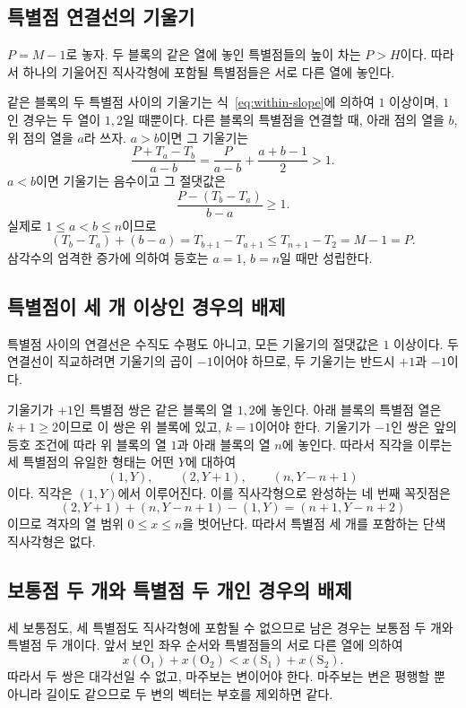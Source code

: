 \documentclass[a4paper,11pt]{article}
\theoremstyle{definition}
\newcommand{\OO}{\mathrm{O}}
\newcommand{\SSp}{\mathrm{S}}
\begin{document}
\subsection{특별점 연결선의 기울기}

$P=M-1$로 놓자. 두 블록의 같은 열에 놓인 특별점들의 높이 차는
$P>H$이다. 따라서 하나의 기울어진 직사각형에 포함될 특별점들은
서로 다른 열에 놓인다.

같은 블록의 두 특별점 사이의 기울기는 식~\eqref{eq:within-slope}에
의하여 $1$ 이상이며, $1$인 경우는 두 열이 $1,2$일 때뿐이다.
다른 블록의 특별점을 연결할 때, 아래 점의 열을 $b$, 위 점의 열을
$a$라 쓰자. $a>b$이면 그 기울기는
\[
  \frac{P+T_a-T_b}{a-b}
  =\frac{P}{a-b}+\frac{a+b-1}{2}>1.
\]
$a<b$이면 기울기는 음수이고 그 절댓값은
\begin{equation}\label{eq:negative-slope}
  \frac{P-(T_b-T_a)}{b-a}\ge1.
\end{equation}
실제로 $1\le a<b\le n$이므로
\[
  (T_b-T_a)+(b-a)=T_{b+1}-T_{a+1}
  \le T_{n+1}-T_2=M-1=P.
\]
삼각수의 엄격한 증가에 의하여 등호는 $a=1$, $b=n$일 때만 성립한다.

\subsection{특별점이 세 개 이상인 경우의 배제}

특별점 사이의 연결선은 수직도 수평도 아니고, 모든 기울기의 절댓값은
$1$ 이상이다. 두 연결선이 직교하려면 기울기의 곱이 $-1$이어야
하므로, 두 기울기는 반드시 $+1$과 $-1$이다.

기울기가 $+1$인 특별점 쌍은 같은 블록의 열 $1,2$에 놓인다.
아래 블록의 특별점 열은 $k+1\ge2$이므로 이 쌍은 위 블록에 있고,
$k=1$이어야 한다. 기울기가 $-1$인 쌍은 앞의 등호 조건에 따라
위 블록의 열 $1$과 아래 블록의 열 $n$에 놓인다.
따라서 직각을 이루는 세 특별점의 유일한 형태는 어떤 $Y$에 대하여
\begin{equation}\label{eq:exceptional}
  (1,Y),\qquad (2,Y+1),\qquad(n,Y-n+1)
\end{equation}
이다. 직각은 $(1,Y)$에서 이루어진다.
이를 직사각형으로 완성하는 네 번째 꼭짓점은
\[
  (2,Y+1)+(n,Y-n+1)-(1,Y)=(n+1,Y-n+2)
\]
이므로 격자의 열 범위 $0\le x\le n$을 벗어난다.
따라서 특별점 세 개를 포함하는 단색 직사각형은 없다.

\subsection{보통점 두 개와 특별점 두 개인 경우의 배제}

세 보통점도, 세 특별점도 직사각형에 포함될 수 없으므로 남은 경우는
보통점 두 개와 특별점 두 개이다. 앞서 보인 좌우 순서와 특별점들의
서로 다른 열에 의하여
\[
  x(\OO_1)+x(\OO_2)<x(\SSp_1)+x(\SSp_2).
\]
따라서 두 쌍은 대각선일 수 없고, 마주보는 변이어야 한다.
마주보는 변은 평행할 뿐 아니라 길이도 같으므로 두 변의 벡터는
부호를 제외하면 같다.
\end{document}
